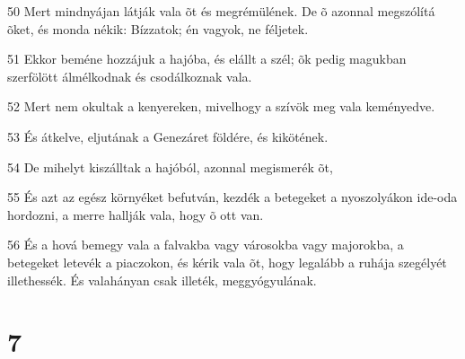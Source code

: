 \par 50 Mert mindnyájan látják vala õt és megrémülének. De õ azonnal megszólítá õket, és monda nékik: Bízzatok; én vagyok, ne féljetek.
\par 51 Ekkor beméne hozzájuk a hajóba, és elállt a szél; õk pedig magukban szerfölött álmélkodnak és csodálkoznak vala.
\par 52 Mert nem okultak a kenyereken, mivelhogy a szívök meg vala keményedve.
\par 53 És átkelve, eljutának a Genezáret földére, és kikötének.
\par 54 De mihelyt kiszálltak a hajóból, azonnal megismerék õt,
\par 55 És azt az egész környéket befutván, kezdék a betegeket a nyoszolyákon ide-oda hordozni, a merre hallják vala, hogy õ ott van.
\par 56 És a hová bemegy vala a falvakba vagy városokba vagy majorokba, a betegeket letevék a piaczokon, és kérik vala õt, hogy legalább a ruhája szegélyét illethessék. És valahányan csak illeték, meggyógyulának.

\chapter{7}

